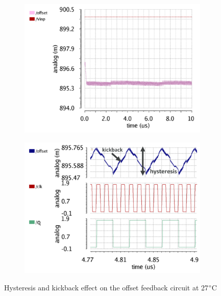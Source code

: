 \begin{figure}[htp]
    \centering
    \begin{subfigure}[b]{0.48\textwidth}
        \includegraphics[width=\textwidth]{Chapter5/Figs/comp_test/comparator_offset_feedback_trans_real.png}
    \end{subfigure}
    \begin{subfigure}[b]{0.48\textwidth}
        \includegraphics[width=\textwidth]{Chapter5/Figs/comp_test/comparator_offset_feedback_trans_real-zoom.png}
    \end{subfigure}
    \caption{Hysteresis and kickback effect on the offset feedback circuit at 27$\degree$C}
    \label{fig:comp_hyst}
\end{figure}

